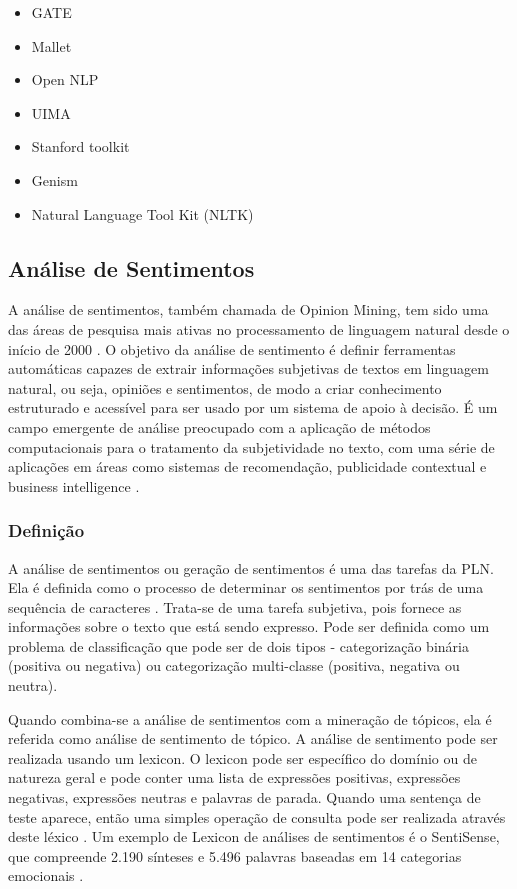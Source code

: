 \documentclass[
	12pt,				%
	openright,			%
	oneside,			%
	a4paper,			%
	english,			%
	spanish,			%
	brazil				%
	]{abntex2}
\begin{document}
	\begin{itemize}
	 	\item GATE
	 	\item Mallet
	 	\item Open NLP
	 	\item UIMA
	 	\item Stanford toolkit
	 	\item Genism
	 	\item Natural Language Tool Kit (NLTK)
	\end{itemize}
	
	\subsection{Análise de Sentimentos}
		A análise de sentimentos, também chamada de Opinion Mining, tem sido uma das áreas de pesquisa mais ativas no processamento de linguagem natural desde o início de 2000 \cite{bliu_2012}. O objetivo da análise de sentimento é definir ferramentas automáticas capazes de extrair informações subjetivas de textos em linguagem natural, ou seja, opiniões e sentimentos, de modo a criar conhecimento estruturado e acessível para ser usado por um sistema de apoio à decisão. É um campo emergente de análise preocupado com a aplicação de métodos computacionais para o tratamento da subjetividade no texto, com uma série de aplicações em áreas como sistemas de recomendação, publicidade contextual e business intelligence \cite{book_discover_practices}.

	\subsubsection*{Definição}
	
	A análise de sentimentos ou geração de sentimentos é uma das tarefas da \gls{PLN}. Ela é definida como o processo de determinar os sentimentos por trás de uma sequência de caracteres \cite{book_natlang_python}. Trata-se de uma tarefa subjetiva, pois fornece as informações sobre o texto que está sendo expresso. Pode ser definida como um problema de classificação que pode ser de dois tipos - categorização binária (positiva ou negativa) ou categorização multi-classe (positiva, negativa ou neutra). 
	
Quando combina-se a análise de sentimentos com a mineração de tópicos, ela é referida como análise de sentimento de tópico. A análise de sentimento pode ser realizada usando um lexicon. O lexicon pode ser específico do domínio ou de natureza geral e pode conter uma lista de expressões positivas, expressões negativas, expressões neutras e palavras de parada. Quando uma sentença de teste aparece, então uma simples operação de consulta pode ser realizada através deste léxico \cite{book_natlang_python}. Um exemplo de Lexicon de análises de sentimentos é o SentiSense, que compreende 2.190 sínteses e 5.496 palavras baseadas em 14 categorias emocionais \cite{carrilho}.
\end{document}
